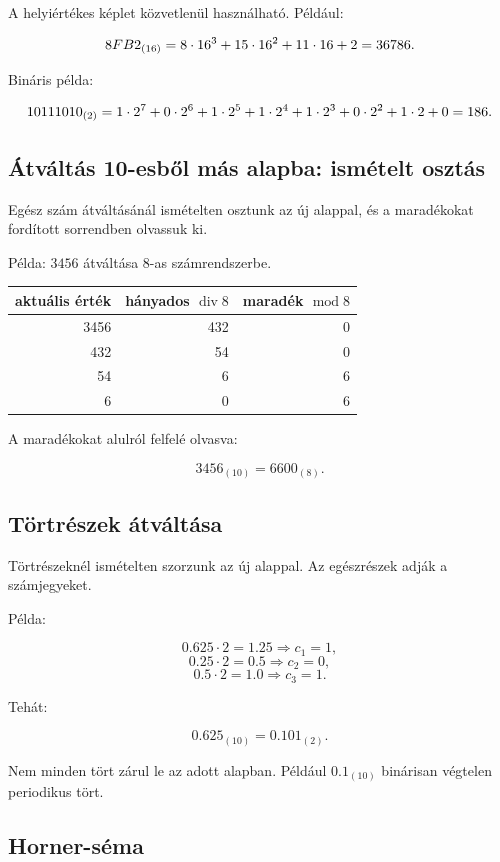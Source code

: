 A helyiértékes képlet közvetlenül használható. Például:

\[
8FB2_{(16)}=8\cdot16^3+15\cdot16^2+11\cdot16+2=36786.
\]

Bináris példa:

\[
10111010_{(2)}=1\cdot2^7+0\cdot2^6+1\cdot2^5+1\cdot2^4+1\cdot2^3+0\cdot2^2+1\cdot2+0=186.
\]

\subsection{Átváltás 10-esből más alapba: ismételt osztás}

Egész szám átváltásánál ismételten osztunk az új alappal, és a maradékokat fordított sorrendben olvassuk ki.

Példa: $3456$ átváltása 8-as számrendszerbe.

\begin{center}
\begin{tabular}{r|r|r}
aktuális érték & hányados $\operatorname{div}8$ & maradék $\operatorname{mod}8$ \\
\midrule
3456 & 432 & 0 \\
432 & 54 & 0 \\
54 & 6 & 6 \\
6 & 0 & 6 \\
\end{tabular}
\end{center}

A maradékokat alulról felfelé olvasva:

\[
3456_{(10)}=6600_{(8)}.
\]

\subsection{Törtrészek átváltása}

Törtrészeknél ismételten szorzunk az új alappal. Az egészrészek adják a számjegyeket.

Példa:

\[
0.625\cdot2=1.25 \Rightarrow c_1=1,
\]
\[
0.25\cdot2=0.5 \Rightarrow c_2=0,
\]
\[
0.5\cdot2=1.0 \Rightarrow c_3=1.
\]

Tehát:

\[
0.625_{(10)}=0.101_{(2)}.
\]

Nem minden tört zárul le az adott alapban. Például $0.1_{(10)}$ binárisan végtelen periodikus tört.

\subsection{Horner-séma}

